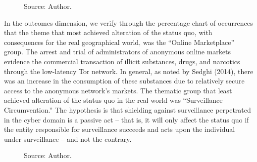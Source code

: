 \begin{figure}[H]
\caption*{Source: Author.}
\end{figure}

In the outcomes dimension, we verify through the percentage chart of occurrences that the theme that most achieved alteration of the status quo, with consequences for the real geographical world, was the ``Online Marketplace'' group. The arrest and trial of administrators of anonymous online markets evidence the commercial transaction of illicit substances, drugs, and narcotics through the low-latency Tor network. In general, as noted by Sedghi (2014), there was an increase in the consumption of these substances due to relatively secure access to the anonymous network's markets. The thematic group that least achieved alteration of the status quo in the real world was ``Surveillance Circumvention.'' The hypothesis is that shielding against surveillance perpetrated in the cyber domain is a passive act -- that is, it will only affect the status quo if the entity responsible for surveillance succeeds and acts upon the individual under surveillance -- and not the contrary.

\begin{figure}[H]
\centering
{}
\caption*{Source: Author.}
\end{figure}

